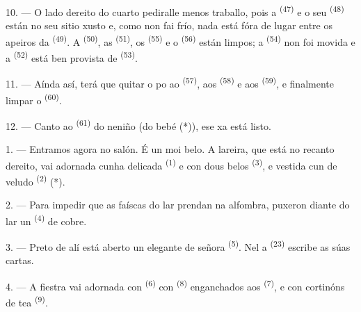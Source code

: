 10. --- O lado dereito do cuarto pediralle menos traballo, pois a 
\textsuperscript{(47)} e o seu  \textsuperscript{(48)} están no seu sitio xusto
e, como non fai frío, nada está fóra de lugar entre os apeiros da
 \textsuperscript{(49)}. A  \textsuperscript{(50)}, as
 \textsuperscript{(51)}, os 
\textsuperscript{(55)} e o  \textsuperscript{(56)} están limpos; a
 \textsuperscript{(54)} non foi movida e a 
\textsuperscript{(52)} está ben provista de  \textsuperscript{(53)}.



11. --- Aínda así, terá que quitar o po ao  \textsuperscript{(57)},
aos  \textsuperscript{(58)} e aos
 \textsuperscript{(59)}, e finalmente limpar o
 \textsuperscript{(60)}.

12. --- Canto ao  \textsuperscript{(61)} do neniño (do bebé (*)), ese xa está
listo.

\VUsaut{5.0mm}
\VUsaut{3.0mm}

1. --- Entramos agora no salón. É un  moi belo. A lareira, que está no recanto
dereito, vai adornada cunha delicada  \textsuperscript{(1)} e con dous belos
 \textsuperscript{(3)}, e vestida cun  de veludo
\textsuperscript{(2)} (*).

2. --- Para impedir que as faíscas do lar prendan na alfombra, puxeron diante do lar un
 \textsuperscript{(4)} de cobre.

3. --- Preto de alí está aberto un elegante  de señora
\textsuperscript{(5)}. Nel a  \textsuperscript{(23)} escribe as súas
cartas.

4. --- A fiestra vai adornada con  \textsuperscript{(6)} con
 \textsuperscript{(8)} enganchados aos 
\textsuperscript{(7)}, e con cortinóns de tea 
\textsuperscript{(9)}.

